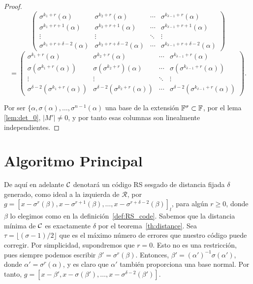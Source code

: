 \begin{proof}
\[
\begin{pmatrix}
    \sigma^{k_1+r}(\alpha) & \sigma^{k_2+r}(\alpha) & \cdots & \sigma^{k_{\delta-1}+r}(\alpha) \\
    \sigma^{k_1+r+1}(\alpha) & \sigma^{k_2+r+1}(\alpha) & \cdots & \sigma^{k_{\delta-1}+r+1}(\alpha) \\
    \vdots & \vdots & \ddots & \vdots \\
    \sigma^{k_1+r+\delta-2}(\alpha) & \sigma^{k_2+r+\delta-2}(\alpha) & \cdots & \sigma^{k_{\delta-1}+r+\delta-2}(\alpha)
\end{pmatrix}
\]
\[
=
\begin{pmatrix}
    \sigma^{k_1+r}(\alpha) & \sigma^{k_2+r}(\alpha) & \cdots & \sigma^{k_{\delta-1}+r}(\alpha) \\
    \sigma(\sigma^{k_1+r}(\alpha)) & \sigma(\sigma^{k_2+r})(\alpha) & \cdots & \sigma(\sigma^{k_{\delta-1}+r}(\alpha)) \\
    \vdots & \vdots & \ddots & \vdots \\
    \sigma^{\delta-2}(\sigma^{k_1+r}(\alpha)) & \sigma^{\delta-2}(\sigma^{k_2+r}(\alpha)) & \cdots & \sigma^{\delta-2}(\sigma^{k_{\delta-1}+r}(\alpha))
\end{pmatrix}
.\]

Por ser \(\{\alpha, \sigma(\alpha), \dots, \sigma^{n-1}(\alpha)\) una base de la extensión \(\mathbb{F}^\sigma \subset \mathbb{F}\), por el lema \ref{lem:det_0}, \(|M'| \neq 0\), y por tanto esas columnas son linealmente independientes.
\end{proof}

\section{Algoritmo Principal}%
\label{sec:algoritmo_principal}

De aquí en adelante \(\mathcal{C}\) denotará un código RS sesgado de distancia fijada \(\delta\) generado, como ideal a la izquierda de  \(\mathcal{R}\), por  \(g = {[x - \sigma^r(\beta), x - \sigma^{r+1}(\beta), \dots, x - \sigma^{r+\delta - 2}(\beta)]}_l\), para algún \(r \geq 0 \), donde \(\beta\) lo elegimos como en la definición~\ref{def:RS_code}. Sabemos que la distancia mínima de \(\mathcal{C}\) es exactamente \(\delta\) por el teorema~\ref{th:distance}. Sea \(\tau = \lfloor (\sigma -1)/2 \rfloor\) que es el máximo número de errores que nuestro código puede corregir. Por simplicidad, supondremos que \(r = 0\). Esto no es una restricción, pues siempre podemos escribir  \(\beta' = \sigma^r(\beta)\). Entonces, \(\beta' = {(\alpha')}^{-1} \sigma(\alpha')\), donde \(\alpha' = \sigma^r(\alpha)\), y es claro que \(\alpha'\) también proporciona una base normal. Por tanto, \(g = [x - \beta', x - \sigma(\beta'), \dots, x - \sigma^{\delta - 2}(\beta')]\).


